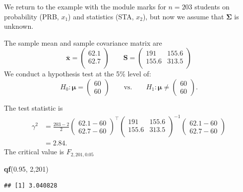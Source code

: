 \documentclass[
]{book}
\newenvironment{Shaded}{\begin{snugshade}}{\end{snugshade}}
\newcommand{\DecValTok}[1]{\textcolor[rgb]{0.00,0.00,0.81}{#1}}
\newcommand{\FloatTok}[1]{\textcolor[rgb]{0.00,0.00,0.81}{#1}}
\newcommand{\FunctionTok}[1]{\textcolor[rgb]{0.13,0.29,0.53}{\textbf{#1}}}
\newcommand{\NormalTok}[1]{#1}
\theoremstyle{definition}
\theoremstyle{definition}
\theoremstyle{definition}
\theoremstyle{definition}
\theoremstyle{remark}
\begin{document}
We return to the example with the module marks for \(n=203\) students on probability (PRB, \(x_1\)) and statistics (STA, \(x_2\)), but now we assume that \(\boldsymbol{\Sigma}\) is unknown.

The sample mean and sample covariance matrix are
\[\bar{\mathbf x} = \begin{pmatrix}62.1 \\62.7 \\\end{pmatrix} \qquad \mathbf S= \begin{pmatrix}191&155.6 \\155.6&313.5 \\\end{pmatrix}\]
We conduct a hypothesis test at the 5\% level of:
\[H_0: {\boldsymbol{\mu}}= \begin{pmatrix} 60 \\ 60 \end{pmatrix} \qquad \text{vs.} \qquad H_1: {\boldsymbol{\mu}}\neq \begin{pmatrix} 60 \\ 60 \end{pmatrix}.\]

The test statistic is
\begin{align*}
\gamma^2 &= \frac{203-2}{2} \begin{pmatrix} 62.1 - 60 \\ 62.7 - 60 \end{pmatrix}^\top \begin{pmatrix}191&155.6 \\155.6&313.5 \\\end{pmatrix}^{-1} \begin{pmatrix} 62.1 - 60 \\ 62.7 - 60 \end{pmatrix} \\
 &= 2.84.
\end{align*}
The critical value is \(F_{2,201,0.05}\)

\begin{Shaded}
\begin{Highlighting}[]
 \FunctionTok{qf}\NormalTok{(}\FloatTok{0.95}\NormalTok{, }\DecValTok{2}\NormalTok{,}\DecValTok{201}\NormalTok{)}
\end{Highlighting}
\end{Shaded}

\begin{verbatim}
## [1] 3.040828
\end{verbatim}
\end{document}
